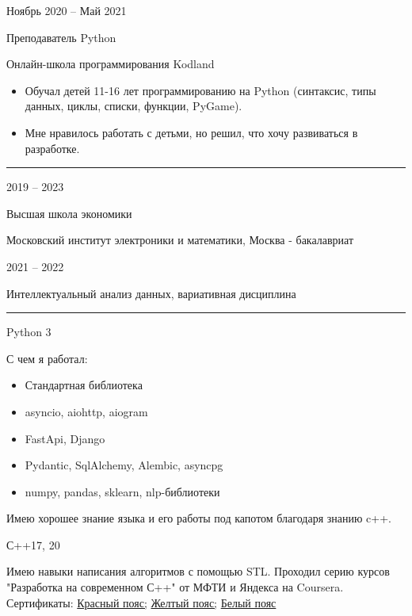 \documentclass[a4paper,10pt]{article}
\newlength{\cvcolumngapwidth}
\newlength{\cvleftcolumnwidth}
\newlength{\cvrightcolumnwidth}
\newcommand{\cvsectionstyle}[1]{{\normalsize\cvsectionfont\textcolor{cvsectioncolor}{#1}}}
\newcommand{\cvtitlestyle}[1]{{\large\cvtitlefont\textcolor{cvtitlecolor}{#1}}}
\newcommand{\cvdurationstyle}[1]{{\small\cvdurationfont\textcolor{cvdurationcolor}{#1}}}
\newcommand{\cvheadingstyle}[1]{{\normalsize\cvheadingfont\textcolor{cvheadingcolor}{#1}}}
\newlength{\cvafteritemskipamount}
\newlength{\cvaftersectionskipamount}
\newlength{\cvbetweensectionandheadingextraskipamount}
\newlength{\cvaftertitleskipamount}
\newlength{\cvparskip}
\newcommand{\cvsection}[1]{
    \begin{minipage}[t]{\cvleftcolumnwidth}
        \raggedleft\cvsectionstyle{#1}
    \end{minipage}%
    \hspace{\cvcolumngapwidth}%
    \begin{minipage}[t]{\cvrightcolumnwidth}
        \textcolor{cvrulecolor}{\rule{\cvrightcolumnwidth}{0.3mm}}
    \end{minipage}

    \vspace{\cvaftersectionskipamount}
}
\newcommand{\cvitem}[2]{
    \begin{minipage}[t]{\cvleftcolumnwidth}
        \raggedleft #1
    \end{minipage}%
    \hspace{\cvcolumngapwidth}%
    \begin{minipage}[t]{\cvrightcolumnwidth}
        \setlength{\parskip}{\cvparskip} #2
    \end{minipage}

    \vspace{\cvafteritemskipamount}
}
\newcommand{\cvtitle}[1]{
    \cvtitlestyle{#1}

    \vspace{\cvaftertitleskipamount}
    \vspace{-\cvparskip}
}
\begin{document}
\cvitem{
    \cvdurationstyle{Ноябрь 2020 -- Май 2021}
}{
    \cvtitle{Преподаватель Python}

    Онлайн-школа программирования Kodland

    \begin{itemize}[leftmargin=*]
        \item Обучал детей 11-16 лет программированию на Python (синтаксис, типы данных, циклы, списки, функции, PyGame).
        \item Мне нравилось работать с детьми, но решил, что хочу развиваться в разработке. 
    \end{itemize}
}



\cvsection{Образование}

\cvitem{
    \cvdurationstyle{2019 -- 2023}
}{
    \cvtitle{Высшая школа экономики}

    Московский институт электроники и математики, Москва - бакалавриат
}

\cvitem{
    \cvdurationstyle{2021 -- 2022}
}{
    Интеллектуальный анализ данных, вариативная дисциплина

}


\cvsection{Навыки}

\vspace{\cvbetweensectionandheadingextraskipamount}

\cvitem{
    \cvheadingstyle{Python 3}
}{
    С чем я работал:
    \begin{itemize}
        \item Стандартная библиотека
        \item asyncio, aiohttp, aiogram
        \item FastApi, Django
        \item Pydantic, SqlAlchemy, Alembic, asyncpg
        \item numpy, pandas, sklearn, nlp-библиотеки
    \end{itemize}

    Имею хорошее знание языка и его работы под капотом благодаря знанию c++.
}

\cvitem{
    \cvheadingstyle{С++17, 20}
}{
    Имею навыки написания алгоритмов с помощью STL.  
    Проходил серию курсов "Разработка на современном С++" от МФТИ и Яндекса на Coursera. Сертификаты: \href{https://coursera.org/share/aa5404b249039031fb8afb2415d9f2d9}{Красный пояс;} \href{https://coursera.org/share/ac14607b020a1162afb5c63cb5624de7}{Желтый пояс;} \href{https://coursera.org/share/fd10894b59ebb0997070e88f79a32d0f}{Белый пояс}
}
\end{document}

